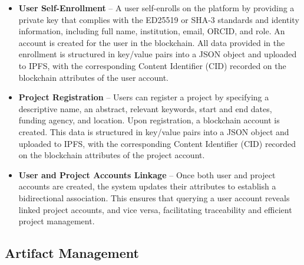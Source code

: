 \documentclass{article}
\begin{document}
\begin{itemize}
      \item \textbf{User Self-Enrollment} – A user self-enrolls on the platform by providing a private key that complies with the ED25519 or SHA-3 standards and identity information, including full name, institution, email, ORCID, and role. An account is created for the user in the blockchain. All data provided in the enrollment is structured in key/value pairs into a JSON object and uploaded to IPFS, with the corresponding Content Identifier (CID) recorded on the blockchain attributes of the user account.

      \item \textbf{Project Registration} – Users can register a project by specifying a descriptive name, an abstract, relevant keywords, start and end dates, funding agency, and location. Upon registration, a blockchain account is created. This data is structured in key/value pairs into a JSON object and uploaded to IPFS, with the corresponding Content Identifier (CID) recorded on the blockchain attributes of the project account.


      \item \textbf{User and Project Accounts Linkage} – Once both user and project accounts are created, the system updates their attributes to establish a bidirectional association. This ensures that querying a user account reveals linked project accounts, and vice versa, facilitating traceability and efficient project management.
\end{itemize}

\subsection{Artifact Management}
\end{document}
